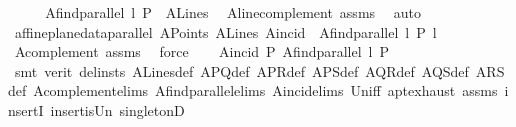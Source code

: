 \begin{isabellebody}
%
\isadelimproof
%
\endisadelimproof
%
\isatagproof
{}\isamarkupfalse%
\ {\isacharminus}{\kern0pt}\isanewline
\ \ \isamarkupfalse%
\ {\isachardoublequoteopen}A{}find{\isacharunderscore}{\kern0pt}parallel\ l\ P\ {\isasymin}\ A{}Lines{\isachardoublequoteclose}\ \isamarkupfalse%
\ A{}line{\isacharunderscore}{\kern0pt}complement\ assms{\isacharparenleft}{\kern0pt}{}{\isacharparenright}{\kern0pt}\ \isamarkupfalse%
\ auto\isanewline
{}\isamarkupfalse%
\isanewline
\ \ \isamarkupfalse%
\ {\isachardoublequoteopen}affine{\isacharunderscore}{\kern0pt}plane{\isacharunderscore}{\kern0pt}data{\isachardot}{\kern0pt}parallel\ A{}Points\ A{}Lines\ A{}incid\ \ {\isacharparenleft}{\kern0pt}A{}find{\isacharunderscore}{\kern0pt}parallel\ l\ P{\isacharparenright}{\kern0pt}\ l{\isachardoublequoteclose}\ \isamarkupfalse%
\ A{}complement\ assms\ \isamarkupfalse%
\ force\isanewline
{}\isamarkupfalse%
\isanewline
\ \ \isamarkupfalse%
\ {\isachardoublequoteopen}A{}incid\ P\ {\isacharparenleft}{\kern0pt}A{}find{\isacharunderscore}{\kern0pt}parallel\ l\ P{\isacharparenright}{\kern0pt}{\isachardoublequoteclose}\ \isanewline
\ \ \isamarkupfalse%
\ {\isacharparenleft}{\kern0pt}smt\ {\isacharparenleft}{\kern0pt}verit{\isacharcomma}{\kern0pt}\ del{\isacharunderscore}{\kern0pt}insts{\isacharparenright}{\kern0pt}\ A{}Lines{\isacharunderscore}{\kern0pt}def\ A{}PQ{\isacharunderscore}{\kern0pt}def\ A{}PR{\isacharunderscore}{\kern0pt}def\ A{}PS{\isacharunderscore}{\kern0pt}def\ A{}QR{\isacharunderscore}{\kern0pt}def\ A{}QS{\isacharunderscore}{\kern0pt}def\ A{}RS{\isacharunderscore}{\kern0pt}def\ A{}complement{\isachardot}{\kern0pt}elims\ A{}find{\isacharunderscore}{\kern0pt}parallel{\isachardot}{\kern0pt}elims\ A{}incid{\isachardot}{\kern0pt}elims{\isacharparenleft}{\kern0pt}{}{\isacharparenright}{\kern0pt}\ Un{\isacharunderscore}{\kern0pt}iff\ a{}pt{\isachardot}{\kern0pt}exhaust\ assms{\isacharparenleft}{\kern0pt}{}{\isacharparenright}{\kern0pt}\ insertI{}\ insert{\isacharunderscore}{\kern0pt}is{\isacharunderscore}{\kern0pt}Un\ singletonD{\isacharparenright}{\kern0pt}\isanewline
{}\isamarkupfalse%

\end{isabellebody}
